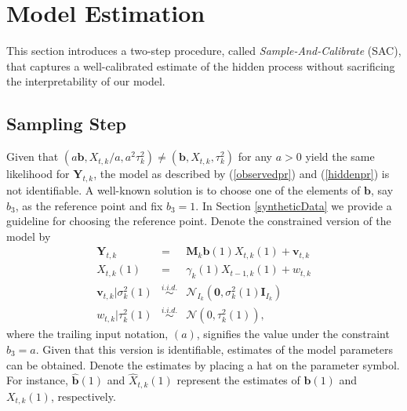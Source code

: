 \documentclass[aoas, preprint]{imsart}
\numberwithin{equation}{section}
\theoremstyle{plain}
\begin{document}
\section{Model Estimation}
\label{identifiability}
This section introduces a two-step procedure, called \textit{Sample-And-Calibrate} (SAC), that captures a well-calibrated estimate of the hidden process without sacrificing the interpretability of our model.

\subsection{Sampling Step}
\label{sampling_step}
Given that $\left(a \boldsymbol{b}, X_{t,k}/a, a^2 \tau_k^2\right) \neq \left(\boldsymbol{b}, X_{t,k}, \tau_k^2\right)$ for any $a > 0$ yield the same  likelihood for $\boldsymbol{Y}_{t,k}$, the model as described by (\ref{observedpr}) and (\ref{hiddenpr}) is not identifiable. A well-known solution is to choose one of the elements of $\boldsymbol{b}$, say $b_3$, as the reference point and fix $b_3 = 1$.  In Section \ref{syntheticData} we provide a guideline for choosing the reference point. Denote the constrained version of the model by
\begin{eqnarray*}
\boldsymbol{Y}_{t, k} &=&  \boldsymbol{M}_k \boldsymbol{b} (1) X_{t, k}(1)+ \boldsymbol{v}_{t, k}\\
X_{t, k}(1) &=& \gamma_k(1) X_{t-1, k}(1) + w_{t, k}\\
\boldsymbol{v}_{t, k} | \sigma^2_k(1) &\stackrel{i.i.d.}{\sim}& \mathcal{N}_{I_k}(\boldsymbol{0}, \sigma^2_k(1) \boldsymbol{I}_{I_k})\\
w_{t, k} | \tau^2_k(1) &\stackrel{i.i.d.}{\sim}& \mathcal{N}\left(0, \tau^2_k(1)\right),
\end{eqnarray*}
where the trailing input notation, $(a)$, signifies the value under the constraint $b_{3} = a$. Given that this version is identifiable, estimates of the model parameters can be obtained. Denote the estimates by placing a hat on the parameter symbol. For instance, $\hat{\boldsymbol{b}}(1)$ and $\hat{X}_{t, k}(1)$ represent the estimates of $\boldsymbol{b}(1)$ and $X_{t, k}(1)$, respectively. 
\end{document}
